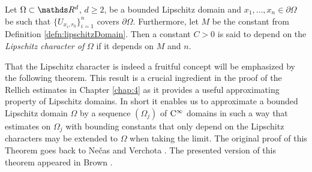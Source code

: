   \begin{defn}
    Let $\Omega \subset \R^d$, $d \geq 2$, be a bounded Lipschitz domain and $x_1, \dots,x_n \in \partial\Omega$ be such that $\{U_{x_i,r_0} \}_{i = 1}^n$ covers $\partial\Omega$.  
    Furthermore, let $M$ be the constant from Definition \ref{defn:lipschitzDomain}.
    Then a constant $C > 0$ is said to depend on the \emph{Lipschitz character of} $\Omega$ if it depends on $M$ and $n$.
  \end{defn}

  That the Lipschitz character is indeed a fruitful concept will be emphasized by the following theorem.
  This result is a crucial ingredient in the proof of the Rellich estimates in Chapter \ref{chap:4} as it provides a useful approximating property of Lipschitz domains. In short it enables us to approximate a bounded Lipschitz domain $\Omega$ by a sequence $(\Omega_j)$ of $\mathrm{C}^\infty$ domains in such a way that estimates on $\Omega_j$ with bounding constants that only depend on the Lipschitz characters may be extended to $\Omega$ when taking the limit.
  The original proof of this Theorem goes back to Ne\v{c}as \cite{necas} and Verchota \cite{verchota}. 
  The presented version of this theorem appeared in Brown \cite{brown}.

